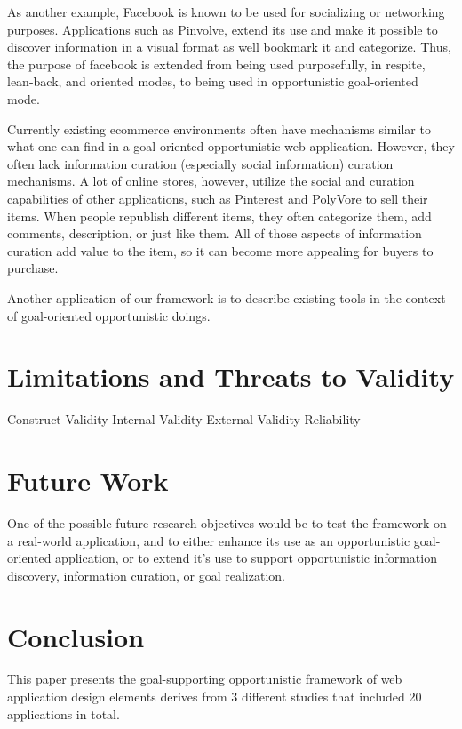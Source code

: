 \documentclass{casconpaper}
\begin{document}
{As another example, Facebook is known to be used for socializing or networking purposes.  Applications such as Pinvolve, extend its use and make it possible to discover information in a visual format as well bookmark it and categorize. Thus, the purpose  of facebook is extended from being used purposefully, in respite, lean-back, and oriented modes, to being used in opportunistic goal-oriented mode. 

Currently existing ecommerce environments often have mechanisms similar to what one can find in a goal-oriented opportunistic web application. However,  they often lack information curation (especially social information) curation mechanisms. A lot of online stores, however, utilize the social and curation capabilities of other applications, such as Pinterest and PolyVore to sell their items. When people republish different items, they often categorize them, add comments, description, or just like them. All of those aspects of information curation add value to the item, so it can become more appealing for buyers to purchase. 

Another application of our framework is to describe existing tools in the context of goal-oriented opportunistic doings. 
} %


{\section{Limitations and Threats to Validity}
Construct Validity
Internal Validity
External Validity
Reliability
} %

{\section{ Future Work}
One of the possible future research objectives would be to test the framework on a real-world application, and to either enhance its use as an opportunistic goal-oriented application, or to extend it’s use  to support opportunistic information discovery, information curation, or goal realization. 

} %

{\section{Conclusion}
This paper presents the goal-supporting opportunistic framework of web application design elements derives from 3 different studies that included 20 applications in total. 
} %
\end{document}
